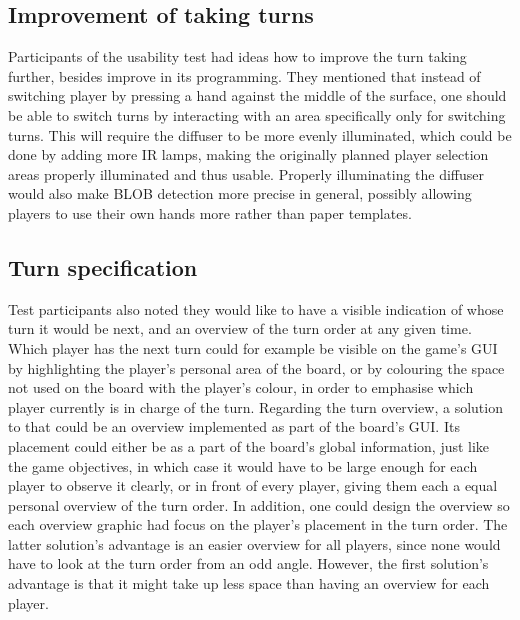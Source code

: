 \subsection{Improvement of taking turns}
Participants of the usability test had ideas how to improve the turn taking further, besides improve in its programming. They mentioned that instead of switching player by pressing a hand against the middle of the surface, one should be able to switch turns by interacting with an area specifically only for switching turns. This will require the diffuser to be more evenly illuminated, which could be done by adding more IR lamps, making the originally planned player selection areas properly illuminated and thus usable. Properly illuminating the diffuser would also make BLOB detection more precise in general, possibly allowing players to use their own hands more rather than paper templates.

\subsection{Turn specification}
Test participants also noted they would like to have a visible indication of whose turn it would be next, and an overview of the turn order at any given time. Which player has the next turn could for example be visible on the game's GUI by highlighting the player's personal area of the board, or by colouring the space not used on the board with the player's colour, in order to emphasise which player currently is in charge of the turn.
Regarding the turn overview, a solution to that could be an overview implemented as part of the board's GUI. Its placement could either be as a part of the board's global information, just like the game objectives, in which case it would have to be large enough for each player to observe it clearly, or in front of every player, giving them each a equal personal overview of the turn order. In addition, one could design the overview so each overview graphic had focus on the player's placement in the turn order. The latter solution's advantage is an easier overview for all players, since none would have to look at the turn order from an odd angle. However, the first solution's advantage is that it might take up less space than having an overview for each player.


